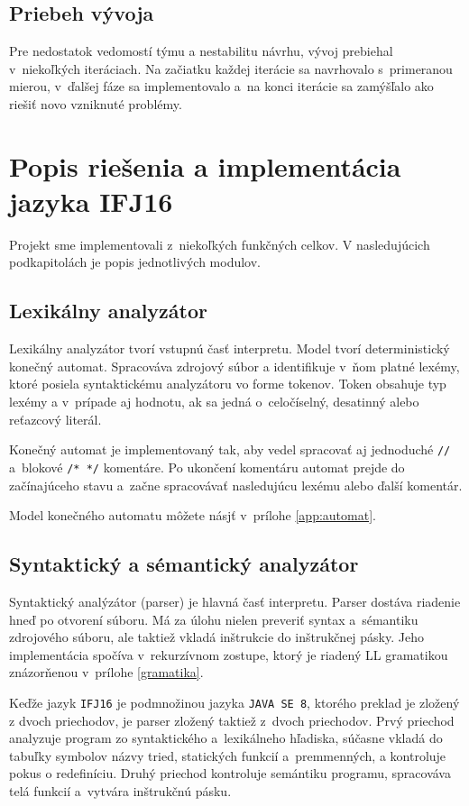 \documentclass[11pt,a4paper]{article}
\begin{document}
	\subsection{Priebeh vývoja}
	\label{vyvoj}
	Pre nedostatok vedomostí týmu a nestabilitu návrhu, vývoj prebiehal v~niekoľkých
	iteráciach. Na začiatku každej iterácie sa navrhovalo s~primeranou mierou,
	v~ďalšej fáze sa implementovalo a~na konci iterácie sa zamýšľalo ako riešiť
	novo vzniknuté problémy.
	
	
	\section{Popis riešenia a implementácia jazyka IFJ16}
	\label{popis}
	
	Projekt sme implementovali z~niekoľkých funkčných celkov. V nasledujúcich podkapitolách je popis jednotlivých modulov.
	
	\subsection{Lexikálny analyzátor}
	\label{lexer}
	Lexikálny analyzátor tvorí vstupnú časť interpretu. Model tvorí deterministický
	konečný automat. Spracováva zdrojový súbor a identifikuje v~ňom platné lexémy,
	ktoré posiela syntaktickému analyzátoru vo forme tokenov. Token obsahuje typ lexémy
	a v~prípade aj hodnotu, ak sa jedná o~celočíselný, desatinný alebo reťazcový literál.
	
	Konečný automat je implementovaný tak, aby vedel spracovať aj jednoduché \texttt{//}
	a~blokové \texttt{/* */} komentáre. Po ukončení komentáru  automat prejde do
	začínajúceho stavu a~začne spracovávať nasledujúcu lexému alebo ďalší komentár.
	
	Model konečného automatu môžete násjť v~prílohe \ref{app:automat}.
	
	
	\subsection{Syntaktický a sémantický analyzátor}
	\label{parser}
	Syntaktický analýzátor (parser) je hlavná časť interpretu. Parser dostáva
	riadenie hneď po otvorení súboru. Má za úlohu nielen preveriť syntax
	a~sémantiku zdrojového súboru, ale taktiež vkladá inštrukcie do inštrukčnej
	pásky. Jeho implementácia spočíva v~rekurzívnom zostupe, ktorý je riadený
	LL gramatikou znázorňenou v~prílohe \ref{gramatika}.
	
	Keďže jazyk \texttt{IFJ16} je podmnožinou jazyka \texttt{JAVA SE 8},
	ktorého preklad je zložený z dvoch priechodov, je parser zložený
	taktiež z~dvoch priechodov. Prvý priechod analyzuje program zo syntaktického
	a~lexikálneho hľadiska, súčasne vkladá do tabuľky symbolov názvy tried,
	statických funkcií a~premmenných, a kontroluje pokus o redefiníciu.
	Druhý priechod kontroluje semántiku
	programu, spracováva telá funkcií a~vytvára inštrukčnú pásku.
	
\end{document}
